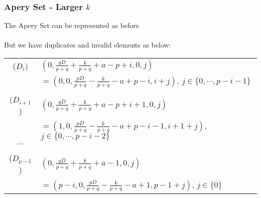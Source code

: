 \documentclass{beamer}
\begin{document}

\begin{frame}[noframenumbering]
\begin{center}
\frametitle{Apery Set - Larger $k$}

The Apery Set can be represented as before\\

~\\

But we have duplicates and invalid elements as below:

{\footnotesize
\begin{center}
\begin{tabular}{cl}
($D_i$) & $\left(0, \frac{q D}{p + q} + \frac{k}{p + q} + a - p + i, 0, j\right)$\\
& $ = \left(0, 0, \frac{p D}{p + q} - \frac{k}{p + q} - a + p - i, i + j\right)$, $j \in \{ 0, \cdots, p - i - 1\}$\\
 &\\
($D_{i + 1}$) & $\left(0, \frac{q D}{p + q} + \frac{k}{p + q} + a - p + i + 1, 0, j\right)$\\
& $ = \left(1, 0, \frac{p D}{p + q} - \frac{k}{p + q} - a + p - i - 1, i + 1 + j\right)$, $j \in \{ 0, \cdots, p - i - 2 \}$\\
$\cdots$ &\\
 &\\
($D_{p - 1}$) & $\left(0, \frac{q D}{p + q} + \frac{k}{p + q} + a - 1, 0, j\right)$\\
& $ = \left(p - i, 0, \frac{p D}{p + q} - \frac{k}{p + q} - a + 1, p - 1 + j\right)$, $j \in \{ 0 \}$\\
\end{tabular}
\end{center}
}

\end{center}
\end{frame}

\end{document}

